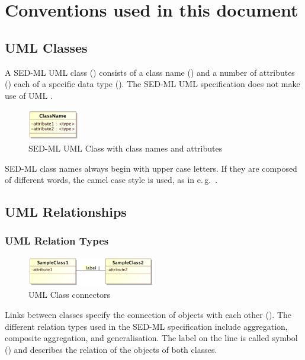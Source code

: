 \section{Conventions used in this document}
\label{sec:conventions}


\subsection{UML Classes}
\label{sec:umlconventions}
A SED-ML UML class () consists of a class name () and a number of attributes () each of a specific data type (). The SED-ML UML specification does not make use of UML .
\begin{figure}[h]
\centering
\includegraphics[width=0.2\textwidth]{images/uml/umlClass.png}
\caption{SED-ML UML Class with class names and attributes}
\label{fig:umlClass}
\end{figure}

SED-ML class names always begin with upper case letters. If they are composed of different words, the camel case style is used, as in e.\,g.\ .

\subsection{UML Relationships}
\subsubsection{UML Relation Types}
\begin{figure}[h]
\centering
\includegraphics[width=0.5\textwidth]{images/uml/classRelation.png}
\caption{UML Class connectors}
\label{fig:umlConnectors}
\end{figure}

Links between classes specify the connection of objects with each other (). The different relation types used in the SED-ML specification include aggregation, composite aggregation, and generalisation. The label on the line is called symbol () and describes the relation of the objects of both classes. 

